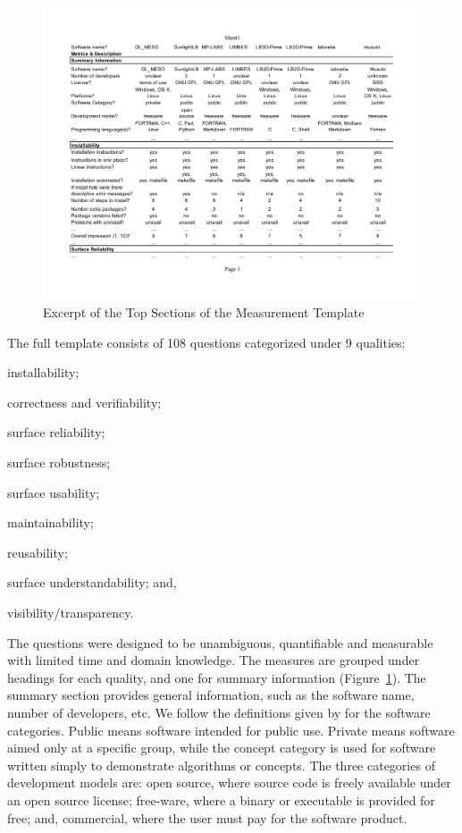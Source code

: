 \documentclass[final, 3p, times, authoryear]{elsarticle}
\begin{document}
\begin{figure}[!ht]
	\begin{center}
	  \includegraphics[width=1.0\textwidth]{./figures/measurement_template.pdf}
	  \caption{Excerpt of the Top Sections of the Measurement Template}
	  \label{measurement_template_image}
	\end{center}
\end{figure}

The full template consists of 108 questions categorized under 9 qualities:
\begin{inparaenum}[(i)]
	\item installability;
	\item correctness and verifiability;
	\item surface reliability;
	\item surface robustness;
	\item surface usability;
	\item maintainability;
	\item reusability;
	\item surface understandability; and,
	\item visibility/transparency. 
\end{inparaenum} 

The questions were designed to be unambiguous, quantifiable and measurable with
limited time and domain knowledge. The measures are grouped under headings for
each quality, and one for summary information
(Figure~\ref{measurement_template_image}).   The summary section provides
general information, such as the software name, number of developers, etc.  We
follow the definitions given by \citet{gewaltig2012quality} for the software
categories.  Public means software intended for public use.  Private means
software aimed only at a specific group, while the concept category is used for
software written simply to demonstrate algorithms or concepts. The three
categories of development models are: open source, where source code is freely
available under an open source license; free-ware, where a binary or executable
is provided for free; and, commercial, where the user must pay for the software
product.  
\end{document}
